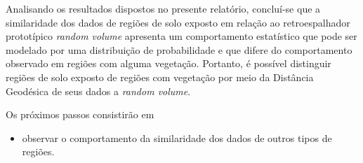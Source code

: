 \documentclass[12pt]{article}
\begin{document}
Analisando os resultados dispostos no presente relatório, concluí-se que a similaridade dos dados de regiões de solo exposto em relação ao retroespalhador prototípico \textit{random volume} apresenta um comportamento estatístico que pode ser modelado por uma distribuição de probabilidade e que difere do comportamento observado em regiões com alguma vegetação. Portanto, é possível distinguir regiões de solo exposto de regiões com vegetação por meio da Distância Geodésica de seus dados a \textit{random volume}.

Os próximos passos consistirão em
\begin{itemize}
  \item observar o comportamento da similaridade dos dados de outros tipos de regiões.
\end{itemize}
\end{document}
